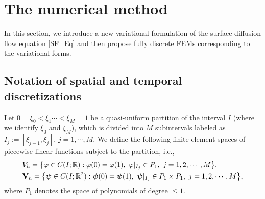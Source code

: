 \documentclass[review]{elsarticle}
\begin{document}




\section{The numerical method}

In this section, we introduce a new variational formulation of the surface diffusion flow equation \eqref{SF_Eq} and then propose fully discrete FEMs corresponding to the variational forms.


\subsection{Notation of spatial and temporal discretizations}
Let $0 = \xi_0<\xi_1 \cdots < \xi_M = 1$ be a quasi-uniform partition of the interval $I$ (where we identify $\xi_0$ and $\xi_M$), which is divided into $M$ subintervals labeled as $I_j := [\xi_{j - 1}, \xi_j]$, $j = 1,\cdots, M$. We define the following finite element spaces of piecewise linear functions subject to the partition, i.e.,
\begin{align}
    & V_h = \big\{\varphi\in C(I; \mathbb{R}): \varphi(0) = \varphi(1), ~\varphi|_{I_j}\in P_1, ~j = 1, 2, \cdots, M \big\},\\
    & {\bf V}_h = \big\{\boldsymbol\psi\in C(I; \mathbb{R}^2): \boldsymbol\psi(0) = \boldsymbol\psi(1), ~\boldsymbol\psi|_{I_j}\in P_1 \times P_1, ~j = 1, 2, \cdots, M \big\},
\end{align}
where $P_1$ denotes the space of polynomials of degree $\le 1$.
\end{document}
